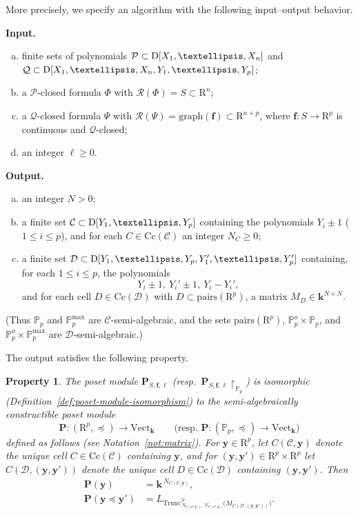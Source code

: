 \documentclass{amsart}[10pts]
\newtheorem{property}{Property}[section]
\theoremstyle{definition}
\theoremstyle{remark}
\theoremstyle{observation}
\numberwithin{equation}{section}
\newcommand {\R} {\mathrm{R}}
\newcommand {\D}     {\mbox{\rm D}}
\newcommand {\kk}         {\mathbf{k}}
\newcommand {\RR} {{\mathcal R}}
\newcommand {\PP}     {\mathbb{P}} %
\newcommand{\y}{\mathbf{y}}
\newcommand{\Cc}{\mathrm{Cc}}
\newcommand{\Pairs}{\mathrm{pairs}}
\newcommand{\Vect}{\mathrm{Vect}}
\newcommand{\Trunc}{\mathrm{Trunc}}
\begin{document}
\medskip
More precisely, we specify an algorithm with the following input--output behavior.

\noindent\textbf{Input.}
\begin{enumerate}[(a)]
\item finite sets of polynomials
$\mathcal P \subset \D[X_1,\ldots,X_n]$ and
$\mathcal Q \subset \D[X_1,\ldots,X_n,Y_1,\ldots,Y_p]$;
\item a $\mathcal P$-closed formula $\Phi$ with $\RR(\Phi)=S\subset \R^n$;
\item a $\mathcal Q$-closed formula $\Psi$ with $\RR(\Psi)=\mathrm{graph}(\mathbf f)\subset \R^{n+p}$, where $\mathbf f:S\to \R^p$ is continuous and $\mathcal Q$-closed;
\item an integer $\ell\ge 0$.
\end{enumerate}

\noindent\textbf{Output.}
\begin{enumerate}[(a)]
\item an integer $N>0$;
\item a finite set $\mathcal C\subset \D[Y_1,\ldots,Y_p]$ containing the polynomials $Y_i\pm 1$ ($1\le i\le p$), and for each
$C\in \Cc(\mathcal C)$ an integer $N_C\ge 0$;
\item a finite set $\mathcal D\subset \D[Y_1,\ldots,Y_p,Y_1',\ldots,Y_p']$ containing, for each $1\le i\le p$, the polynomials
\[
\ Y_i\pm 1,\ Y_i'\pm 1,\ Y_i-Y_i',
\]
and for each cell $D\in \Cc(\mathcal D)$ with $D\subset \Pairs(\R^p)$, a matrix $M_D\in \kk^{N\times N}$.
\end{enumerate}
(Thus $\PP_p$ and $\PP_p^{\max}$ are $\mathcal C$-semi-algebraic, and the sets $\Pairs(\R^p)$, $\PP_p^o\times \PP_p$, and $\PP_p^o\times \PP_p^{\max}$ are $\mathcal D$-semi-algebraic.)

\medskip
The output satisfies the following property.

\begin{property}
\label{property:input-output}
The poset module $\mathbf P_{S,\mathbf f,\ell}$ (resp.\ $\mathbf P_{S,\mathbf f,\ell}\!\restriction_{\PP_p}$) is isomorphic (Definition~\ref{def:poset-module-isomorphism}) to the semi-algebraically constructible poset module
\[
\mathbf P:(\R^p,\preceq)\to \Vect_{\kk}
\qquad
\text{(resp.\ $\mathbf P:(\PP_p,\preceq)\to \Vect_{\kk}$)}
\]
defined as follows (see Notation~\ref{not:matrix}).
For $\y\in \R^p$, let $C(\mathcal C,\y)$ denote the unique cell $C\in \Cc(\mathcal C)$ containing $\y$, and for $(\y,\y')\in \R^p\times \R^p$ let
$C(\mathcal D,(\y,\y'))$ denote the unique cell $D\in \Cc(\mathcal D)$ containing $(\y,\y')$.
Then
\begin{align*}
\mathbf P(\y) &= \kk^{\,N_{C(\mathcal C,\y)}},\\
\mathbf P(\y\preceq \y') &= 
L_{\Trunc^{N}_{\,N_{C(\mathcal C,\y')},\,N_{C(\mathcal C,\y)}}\!\bigl(M_{C(\mathcal D,(\y,\y'))}\bigr)}.
\end{align*}
\end{property}
\end{document}
